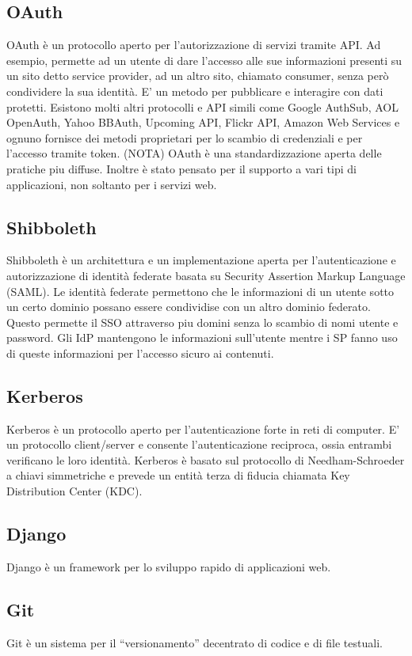 \subsection{OAuth}
OAuth è un protocollo aperto per l'autorizzazione di servizi tramite
API. Ad esempio, permette ad un utente di dare l'accesso alle sue
informazioni presenti su un sito detto service provider, ad un altro
sito, chiamato consumer, senza però condividere la sua identità. E' un
metodo per pubblicare e interagire con dati protetti. Esistono molti
altri protocolli e API simili come Google AuthSub, AOL OpenAuth, Yahoo
BBAuth, Upcoming API, Flickr API, Amazon Web Services e ognuno
fornisce dei metodi proprietari per lo scambio di credenziali e per
l'accesso tramite token. (NOTA) OAuth è una standardizzazione aperta
delle pratiche piu diffuse. Inoltre è stato pensato per il supporto a
vari tipi di applicazioni, non soltanto per i servizi web.


\subsection{Shibboleth}
Shibboleth è un architettura e un implementazione aperta per
l'autenticazione e autorizzazione di identità federate basata su
Security Assertion Markup Language (SAML). Le identità federate
permettono che le informazioni di un utente sotto un certo dominio
possano essere condividise con un altro dominio federato. Questo
permette il SSO attraverso piu domini senza lo scambio di nomi utente
e password. Gli IdP mantengono le informazioni sull'utente mentre i SP
fanno uso di queste informazioni per l'accesso sicuro ai contenuti.

\subsection{Kerberos}
Kerberos è un protocollo aperto per l'autenticazione forte in reti di
computer. E' un protocollo client/server e consente l'autenticazione
reciproca, ossia entrambi verificano le loro identità. Kerberos è
basato sul protocollo di Needham-Schroeder a chiavi simmetriche e
prevede un entità terza di fiducia chiamata Key Distribution Center
(KDC).

\subsection{Django}
Django è un framework per lo sviluppo rapido di applicazioni web.

\subsection{Git}\label{sec:GIT}
Git è un sistema per il ``versionamento'' decentrato di codice e di file
testuali. 

